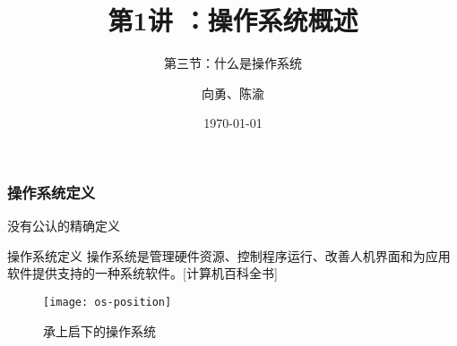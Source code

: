 


\title[第1讲]{第1讲 ：操作系统概述} %
\subtitle{第三节：什么是操作系统}
\author{向勇、陈渝} %
\date{\today} %



\begin{frame}
\titlepage %
\end{frame}

%
%


\begin{frame}

\frametitle{操作系统定义}


没有公认的精确定义

\begin{block}{操作系统定义}
操作系统是管理硬件资源、控制程序运行、改善人机界面和为应用软件提供支持的一种系统软件。[计算机百科全书]
\end{block}


\begin{figure}
	\centering
	\texttt{[image: os-position]}
	\caption{承上启下的操作系统}
\end{figure}

\end{frame}


